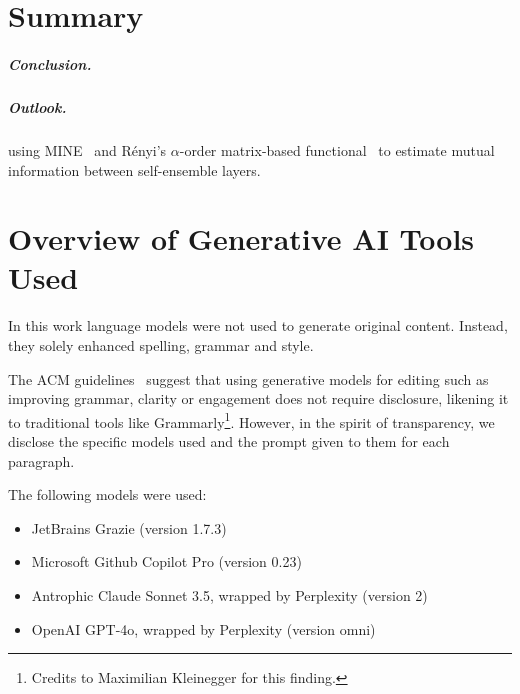 \documentclass[a4paper, oneside]{discothesis}
\begin{document}
\chapter{Summary}

\paragraph{Conclusion.}

\paragraph{Outlook.}

using MINE~\cite{pmlr-v80-belghazi18a} and Rényi's $\alpha$-order matrix-based functional~\cite{6954500} to estimate mutual information between self-ensemble layers.







\bigskip



\appendix


\chapter*{Overview of Generative AI Tools Used}

In this work language models were not used to generate original content. Instead, they solely enhanced spelling, grammar and style.

The ACM guidelines~\cite{acm_authorship_2024} suggest that using generative models for editing \textendash{} such as improving grammar, clarity or engagement \textendash{} does not require disclosure, likening it to traditional tools like Grammarly\footnote{Credits to Maximilian Kleinegger for this finding.}. However, in the spirit of transparency, we disclose the specific models used and the prompt given to them for each paragraph.

The following models were used:

\begin{itemize}
	\item JetBrains Grazie (version 1.7.3)
	\item Microsoft Github Copilot Pro (version 0.23)
	\item Antrophic Claude Sonnet 3.5, wrapped by Perplexity (version 2)
	\item OpenAI GPT-4o, wrapped by Perplexity (version omni)
\end{itemize}
\end{document}
